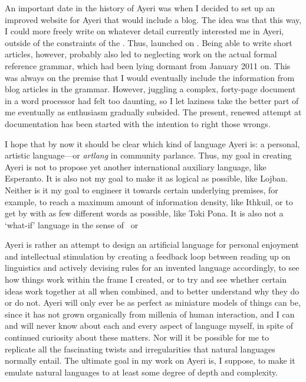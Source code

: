 An important date in the history of Ayeri was when I decided to set up an
improved website for Ayeri that would include a blog. The idea was that this
way, I could more freely write on whatever detail currently interested me in
Ayeri, outside of the constraints of the . Thus,  launched on . Being able to write
short articles, however, probably also led to neglecting work on the actual
formal reference grammar, which had been lying dormant from January 2011 on.
This was always on the premise that I would eventually include the information
from blog articles in the grammar. However, juggling a complex, forty-page
document in a word processor had felt too daunting, so I let laziness take the
better part of me eventually as enthusiasm gradually subsided. 
The present, renewed attempt at documentation has been started with the
intention to right those wrongs.

I hope that by now it should be clear which kind of language Ayeri is: a
personal, artistic language---or \emph{artlang} in community parlance. Thus, my
goal in creating Ayeri is not to propose yet another international auxiliary
language, like Esperanto. It is also not my goal to make it as logical as
possible, like Lojban. Neither is it my goal to engineer it towards certain
underlying premises, for example, to reach a maximum amount of information
density, like Ithkuil, or to get by with as few different words as possible,
like Toki Pona. It is also not a `what-if' language in the sense of
\ or 

Ayeri is rather an attempt to design an artificial language for personal
enjoyment and intellectual stimulation by creating a feedback loop between
reading up on linguistics and actively devising rules for an invented language
accordingly, to see how things work within the frame I created, or to try and
see whether certain ideas work together at all when combined, and to better
understand why they do or do not. Ayeri will only ever be as perfect as
miniature models of things can be, since it has not grown organically from
millenia of human interaction, and I can and will never know about each and
every aspect of language myself, in spite of continued curiosity about these
matters. Nor will it be possible for me to replicate all the fascinating twists
and irregularities that natural languages normally entail. The ultimate
goal in my work on Ayeri is, I suppose, to make it emulate natural
languages to at least some degree of depth and complexity.


